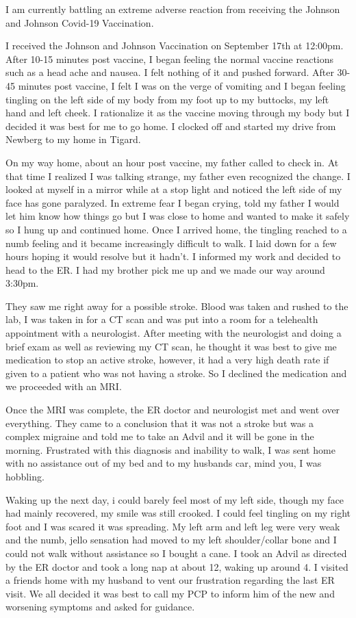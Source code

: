 I am currently battling an extreme adverse reaction from receiving the Johnson
and Johnson Covid-19 Vaccination.

I received the Johnson and Johnson Vaccination on September 17th at
12:00pm. After 10-15 minutes post vaccine, I began feeling the normal vaccine
reactions such as a head ache and nausea. I felt nothing of it and pushed
forward. After 30-45 minutes post vaccine, I felt I was on the verge of vomiting
and I began feeling tingling on the left side of my body from my foot up to my
buttocks, my left hand and left cheek. I rationalize it as the vaccine moving
through my body but I decided it was best for me to go home. I clocked off and
started my drive from Newberg to my home in Tigard.

On my way home, about an hour post vaccine, my father called to check in. At
that time I realized I was talking strange, my father even recognized the
change. I looked at myself in a mirror while at a stop light and noticed the
left side of my face has gone paralyzed. In extreme fear I began crying, told my
father I would let him know how things go but I was close to home and wanted to
make it safely so I hung up and continued home. Once I arrived home, the
tingling reached to a numb feeling and it became increasingly difficult to
walk. I laid down for a few hours hoping it would resolve but it hadn’t. I
informed my work and decided to head to the ER. I had my brother pick me up and
we made our way around 3:30pm.

They saw me right away for a possible stroke. Blood was taken and rushed to the
lab, I was taken in for a CT scan and was put into a room for a telehealth
appointment with a neurologist. After meeting with the neurologist and doing a
brief exam as well as reviewing my CT scan, he thought it was best to give me
medication to stop an active stroke, however, it had a very high death rate if
given to a patient who was not having a stroke. So I declined the medication and
we proceeded with an MRI.

Once the MRI was complete, the ER doctor and neurologist met and went over
everything. They came to a conclusion that it was not a stroke but was a complex
migraine and told me to take an Advil and it will be gone in the
morning. Frustrated with this diagnosis and inability to walk, I was sent home
with no assistance out of my bed and to my husbands car, mind you, I was
hobbling.

Waking up the next day, i could barely feel most of my left side, though my face
had mainly recovered, my smile was still crooked. I could feel tingling on my
right foot and I was scared it was spreading. My left arm and left leg were very
weak and the numb, jello sensation had moved to my left shoulder/collar bone and
I could not walk without assistance so I bought a cane. I took an Advil as
directed by the ER doctor and took a long nap at about 12, waking up around 4. I
visited a friends home with my husband to vent our frustration regarding the
last ER visit. We all decided it was best to call my PCP to inform him of the
new and worsening symptoms and asked for guidance.

